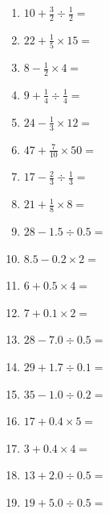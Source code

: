 \documentclass[12pt]{article}
\begin{document}
\begin{enumerate}
\item \large $ 10 + \frac{3}{2} \div \frac{1}{2} = $ \vspace{1.6cm}
\item \large $ 22 + \frac{1}{5} \times 15 = $ \vspace{1.6cm}
\item \large $ 8 - \frac{1}{2} \times 4 = $ \vspace{1.6cm}
\newpage
\item \large $ 9 + \frac{1}{4} \div \frac{1}{4} = $ \vspace{1.6cm}
\item \large $ 24 - \frac{1}{3} \times 12 = $ \vspace{1.6cm}
\item \large $ 47 + \frac{7}{10} \times 50 = $ \vspace{1.6cm}
\item \large $ 17 - \frac{2}{3} \div \frac{1}{3} = $ \vspace{1.6cm}
\item \large $ 21 + \frac{1}{8} \times 8 = $ \vspace{1.6cm}
\item \large $ 28 - 1.5 \div 0.5 = $ \vspace{1.6cm}
\item \large $ 8.5 - 0.2 \times 2 = $ \vspace{1.6cm}
\item \large $ 6 + 0.5 \times 4 = $ \vspace{1.6cm}
\item \large $ 7 + 0.1 \times 2 = $ \vspace{1.6cm}
\item \large $ 28 - 7.0 \div 0.5 = $ \vspace{1.6cm}
\newpage
\item \large $ 29 + 1.7 \div 0.1 = $ \vspace{1.6cm}
\item \large $ 35 - 1.0 \div 0.2 = $ \vspace{1.6cm}
\item \large $ 17 + 0.4 \times 5 = $ \vspace{1.6cm}
\item \large $ 3 + 0.4 \times 4 = $ \vspace{1.6cm}
\item \large $ 13 + 2.0 \div 0.5 = $ \vspace{1.6cm}
\item \large $ 19 + 5.0 \div 0.5 = $ \vspace{1.6cm}

\end{enumerate}
\end{document}
